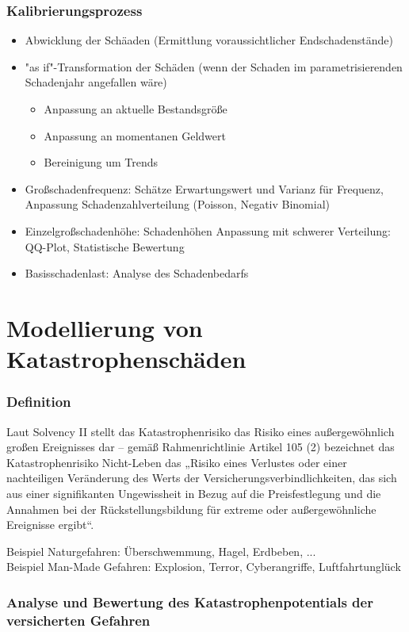 \documentclass[12pt]{report}
\theoremstyle{dotless}
\theoremstyle{definition}
\begin{document}
\subsubsection{Kalibrierungsprozess}
\begin{itemize}
\item Abwicklung der Schäaden (Ermittlung voraussichtlicher Endschadenstände)
\item "as if"-Transformation der Schäden (wenn der Schaden im parametrisierenden Schadenjahr angefallen wäre)
\begin{itemize}
\item Anpassung an aktuelle Bestandsgröße
\item Anpassung an momentanen Geldwert
\item Bereinigung um Trends
\end{itemize}
\item Großschadenfrequenz: Schätze Erwartungswert und Varianz für Frequenz, Anpassung Schadenzahlverteilung (Poisson, Negativ Binomial)
\item Einzelgroßschadenhöhe: Schadenhöhen Anpassung mit schwerer Verteilung: QQ-Plot, Statistische Bewertung
\item Basisschadenlast: Analyse des Schadenbedarfs
\end{itemize}


\section{Modellierung von Katastrophenschäden}

\subsubsection{Definition}
Laut Solvency II stellt das Katastrophenrisiko das Risiko eines außergewöhnlich großen Ereignisses dar – gemäß Rahmenrichtlinie Artikel 105 (2) bezeichnet das Katastrophenrisiko Nicht-Leben das „Risiko eines Verlustes oder einer nachteiligen Veränderung des Werts der Versicherungsverbindlichkeiten, das sich aus einer signifikanten Ungewissheit in Bezug auf die Preisfestlegung und die Annahmen bei der Rückstellungsbildung für extreme oder außergewöhnliche Ereignisse ergibt“.

Beispiel Naturgefahren: Überschwemmung, Hagel, Erdbeben, ... \\
Beispiel Man-Made Gefahren: Explosion, Terror, Cyberangriffe, Luftfahrtunglück

\subsubsection{Analyse und Bewertung des Katastrophenpotentials der versicherten Gefahren}
\end{document}
